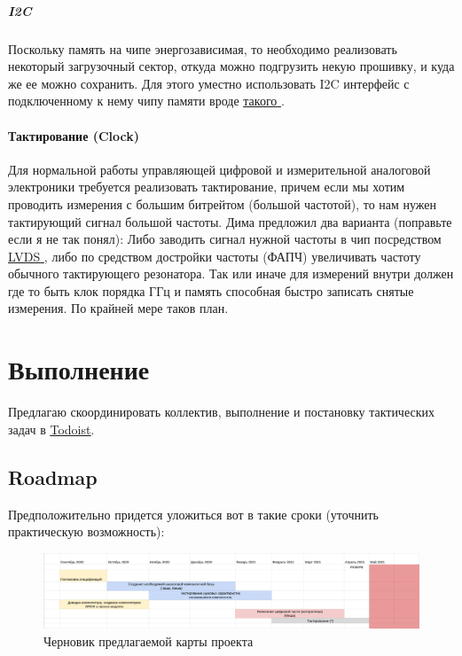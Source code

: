 \documentclass[a4paper,12pt]{article} %
\newcommand{\link}[2]{\underline{\href{#1}{#2} }}
\begin{document}
\subparagraph{I2C}

Поскольку память на чипе энергозависимая, то необходимо реализовать некоторый загрузочный сектор, откуда можно подгрузить некую прошивку, и куда же ее можно сохранить. Для этого уместно использовать I2C интерфейс с подключенному к нему чипу  памяти вроде \link{https://www.fujitsu.com/downloads/MICRO/fsa/pdf/products/memory/fram/MB85RC64A-DS501-00019-2v0-E.pdf}{такого}.

\paragraph{ Тактирование (Clock)}
Для нормальной работы управляющей цифровой и измерительной аналоговой электроники требуется реализовать тактирование, причем если мы хотим проводить измерения с большим битрейтом (большой частотой), то нам нужен тактирующий сигнал большой частоты. Дима предложил два варианта (поправьте если я не так понял): Либо заводить сигнал нужной частоты в чип посредством \link{https://ru.wikipedia.org/wiki/LVDS}{LVDS}, либо по средством достройки частоты (ФАПЧ) увеличивать частоту обычного тактирующего резонатора. Так или иначе для измерений внутри должен где то быть клок порядка  ГГц и память способная быстро записать снятые измерения. По крайней мере таков план.


\section{Выполнение}





Предлагаю скоординировать коллектив, выполнение и постановку тактических задач в \underline {\href{todoist.com}{Todoist}}.

\subsection{Roadmap}

Предположительно придется уложиться вот в такие сроки (уточнить практическую возможность):


\begin{figure}[h]
\centering
\includegraphics[width=1.1\textwidth]{roadmap.png}
\caption{ Черновик предлагаемой карты проекта}
\end{figure}
\end{document}
